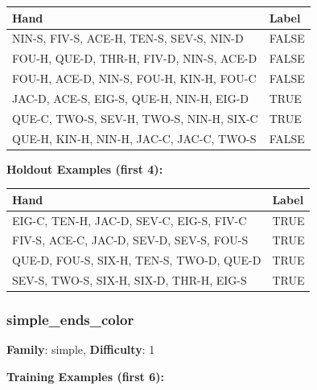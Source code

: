 \documentclass[10pt,a4paper]{article}
\begin{document}
\begin{small}
\begin{tabular}{p{8cm}l}
\toprule
Hand & Label \\
\midrule
NIN-S, FIV-S, ACE-H, TEN-S, SEV-S, NIN-D & \textcolor{negative}{FALSE} \\
FOU-H, QUE-D, THR-H, FIV-D, NIN-S, ACE-D & \textcolor{negative}{FALSE} \\
FOU-H, ACE-D, NIN-S, FOU-H, KIN-H, FOU-C & \textcolor{negative}{FALSE} \\
JAC-D, ACE-S, EIG-S, QUE-H, NIN-H, EIG-D & \textcolor{positive}{TRUE} \\
QUE-C, TWO-S, SEV-H, TWO-S, NIN-H, SIX-C & \textcolor{positive}{TRUE} \\
QUE-H, KIN-H, NIN-H, JAC-C, JAC-C, TWO-S & \textcolor{negative}{FALSE} \\
\bottomrule
\end{tabular}
\end{small}

\textbf{Holdout Examples (first 4):}

\begin{small}
\begin{tabular}{p{8cm}l}
\toprule
Hand & Label \\
\midrule
EIG-C, TEN-H, JAC-D, SEV-C, EIG-S, FIV-C & \textcolor{positive}{TRUE} \\
FIV-S, ACE-C, JAC-D, SEV-D, SEV-S, FOU-S & \textcolor{positive}{TRUE} \\
QUE-D, FOU-S, SIX-H, TEN-S, TWO-D, QUE-D & \textcolor{positive}{TRUE} \\
SEV-S, TWO-S, SIX-H, SIX-D, THR-H, EIG-S & \textcolor{positive}{TRUE} \\
\bottomrule
\end{tabular}
\end{small}

\vspace{0.5cm}

\subsubsection{simple\_ends\_color}

\textbf{Family}: simple, \textbf{Difficulty}: 1

\textbf{Training Examples (first 6):}
\end{document}
